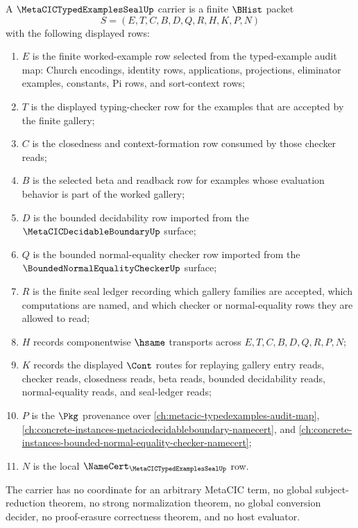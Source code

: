 \begin{definition}
\label{def:metacic-typedexamples-seal-carrier}
A $\MetaCICTypedExamplesSealUp$ carrier is a finite $\BHist$ packet
$$
S=(E,T,C,B,D,Q,R,H,K,P,N)
$$
with the following displayed rows:
\begin{enumerate}
\item $E$ is the finite worked-example row selected from the typed-example audit map: Church encodings, identity rows, applications, projections, eliminator examples, constants, Pi rows, and sort-context rows;
\item $T$ is the displayed typing-checker row for the examples that are accepted by the finite gallery;
\item $C$ is the closedness and context-formation row consumed by those checker reads;
\item $B$ is the selected beta and readback row for examples whose evaluation behavior is part of the worked gallery;
\item $D$ is the bounded decidability row imported from the $\MetaCICDecidableBoundaryUp$ surface;
\item $Q$ is the bounded normal-equality checker row imported from the $\BoundedNormalEqualityCheckerUp$ surface;
\item $R$ is the finite seal ledger recording which gallery families are accepted, which computations are named, and which checker or normal-equality rows they are allowed to read;
\item $H$ records componentwise $\hsame$ transports across $E,T,C,B,D,Q,R,P,N$;
\item $K$ records the displayed $\Cont$ routes for replaying gallery entry reads, checker reads, closedness reads, beta reads, bounded decidability reads, normal-equality reads, and seal-ledger reads;
\item $P$ is the $\Pkg$ provenance over \autoref{ch:metacic-typedexamples-audit-map}, \autoref{ch:concrete-instances-metacicdecidableboundary-namecert}, and \autoref{ch:concrete-instances-bounded-normal-equality-checker-namecert};
\item $N$ is the local $\NameCert_{\MetaCICTypedExamplesSealUp}$ row.
\end{enumerate}
The carrier has no coordinate for an arbitrary MetaCIC term, no global subject-reduction theorem, no strong normalization theorem, no global conversion decider, no proof-erasure correctness theorem, and no host evaluator.
\end{definition}

